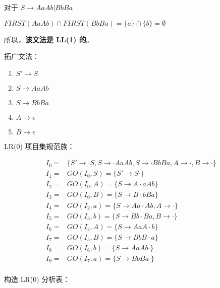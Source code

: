 \begin{enumerate}
    对于 $S \to AaAb | BbBa $
    
    $ FIRST(AaAb) \cap FIRST(BbBa) = \{a\} \cap \{b\} = \emptyset $
    
    所以，\textbf{该文法是 LL(1) 的}。
    
    拓广文法：
    
    \begin{enumerate}[(1)]
        \item $S' \to S$
        \item $S \to AaAb$
        \item $S \to BbBa$
        \item $A \to \epsilon$
        \item $B \to \epsilon$
    \end{enumerate}
    
    LR(0) 项目集规范族：
    
    \begin{equation*}
        \begin{array}{cl}
            I_0 = & \{S' \to \cdot S, S \to \cdot AaAb, S \to \cdot BbBa, A \to \cdot, B \to \cdot \} \\
            \hline
            I_1 = & GO(I_0, S) = \{S' \to S \cdot \} \\
            I_2 = & GO(I_0, A) = \{S \to A \cdot aAb \} \\
            I_3 = & GO(I_0, B) = \{S \to B \cdot bBa \} \\
            \hline
            I_4 = & GO(I_2, a) = \{S \to Aa \cdot Ab, A \to \cdot\} \\
            \hline
            I_5 = & GO(I_3, b) = \{S \to Bb \cdot Ba, B \to \cdot\} \\
            \hline
            I_6 = & GO(I_4, A) = \{S \to AaA \cdot b\} \\
            \hline
            I_7 = & GO(I_5, B) = \{S \to BbB \cdot a\} \\
            \hline
            I_8 = & GO(I_6, b) = \{S \to AaAb \cdot\} \\
            \hline
            I_9 = & GO(I_7, a) = \{S \to BbBa \cdot\} \\
        \end{array}
    \end{equation*}
    
    构造 LR(0) 分析表：
    

\end{enumerate}
